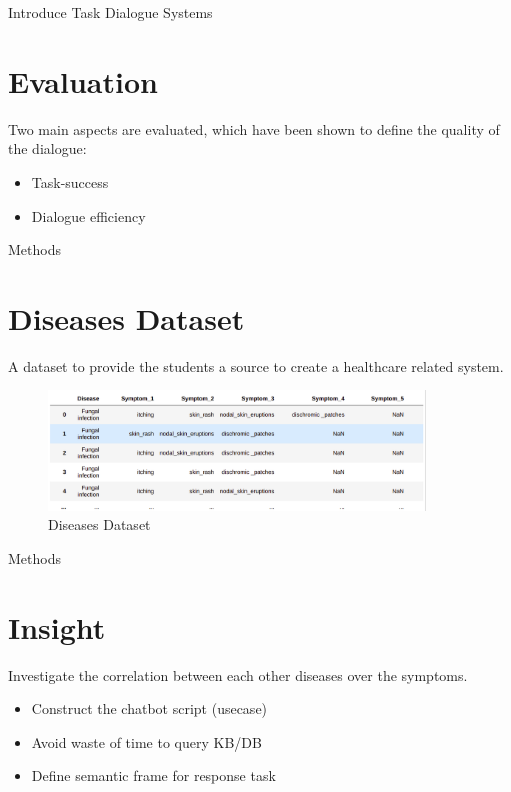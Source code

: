 \documentclass[10pt]{beamer}
\begin{document}
\begin{frame}{Introduce Task Dialogue Systems}
\section{Evaluation}
Two main aspects are evaluated, which have been shown to define the quality of the dialogue:
\begin{itemize}
    \item Task-success
    \item Dialogue efficiency
\end{itemize}

\end{frame}

\begin{frame}{Methods}
\section{Diseases Dataset}
A dataset to provide the students a source to create a healthcare related system.

\begin{figure}[H]
    \centering
    \includegraphics[width=10cm]{image/diseases_dataset.png}
    \caption{Diseases Dataset}
    \label{fig:di_ds}
\end{figure}

\end{frame}

\begin{frame}{Methods}
    \section{Insight}
    Investigate the correlation between each other diseases over the symptoms.
    \begin{itemize}
    \item Construct the chatbot script (usecase)
    \item Avoid waste of time to query KB/DB
    \item Define semantic frame for response task
    \end{itemize}
\end{frame}
\end{document}
